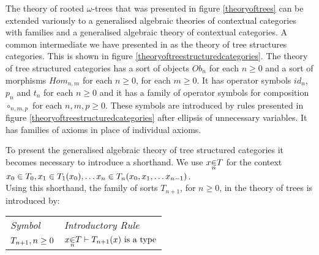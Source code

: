 



\note
The theory of rooted $\omega$-trees that was presented in figure \ref{theoryoftrees} can be extended variously to a generalised algebraic theories of 
contextual categories with families and a generalised algebraic theory of contextual categories.
A common intermediate we have presented in \cite{Cartmell2018A} as the theory of tree structures categories.
This is shown in figure \ref{theoryoftreestructuredcategories}.   The theory of tree structured categories has
a sort of objects $Ob_n$ for each $n \geq 0$ and a sort of morphisms $Hom_{n,m}$ for each $n \geq 0$, for each $m \geq 0$. It has operator symbols $id_n$, $p_n$ and $t_n$ for each  $n \geq 0$ and it has
a family of operator symbols for composition $\circ_{n,m,p}$ for each $n,m,p \geq 0$. These 
symbols are introduced by rules presented in figure \ref{theoryoftreestructuredcategories} after ellipsis
of unnecessary variables. It has families of axioms in place of individual axioms. 

\note
To present the generalised algebraic theory of tree structured categories it becomes necessary to introduce a shorthand. We use 
$\ofTn{x}{n}{T}$ for the context $x_0 \in T_0,x_1 \in T_{1}(x_0), \hdots x_n \in T_{n}(x_0,x_1,\hdots x_{n-1}) $. \\

\noindent Using this shorthand,  the family of sorts $T_{n+1}$, for $n \geq 0$,  in the theory of trees is introduced by: \\

\vspace{0.03cm} 
\begin{tabular}{>{\itshape}l l}
Symbol & \itshape{Introductory Rule} \\
$T_{n+1}, n \geq 0 $ & $\ofTn{x}{n}{T}    \tstyle \isT{\Si{n+1}(x)} $\\
\end{tabular} \\
\vspace{.1cm}  \\

